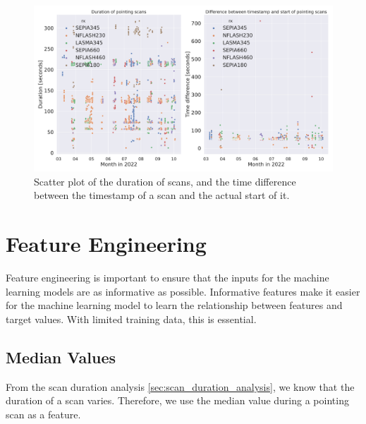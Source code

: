 \begin{figure}[H]
    \centering
    \includegraphics[width=1.1\textwidth]{Tiltmeter plots/scan_duration_distribution_date.pdf}
    \caption[Scatter plot with pointing scan duration and start time throughout 2022.]{Scatter plot of the duration of scans, and the time difference between the timestamp of a scan and the actual start of it.}
    \label{fig:scan_times_date}
\end{figure}


\section{Feature Engineering}\label{sec:feature_engineering}
Feature engineering is important to ensure that the inputs for the machine learning models are as informative as possible.
Informative features make it easier for the machine learning model to learn the relationship between features and target values.
With limited training data, this is essential.



\subsection{Median Values}
From the scan duration analysis \ref{sec:scan_duration_analysis}, we know that the duration of a scan varies.
Therefore, we use the median value during a pointing scan as a feature.


